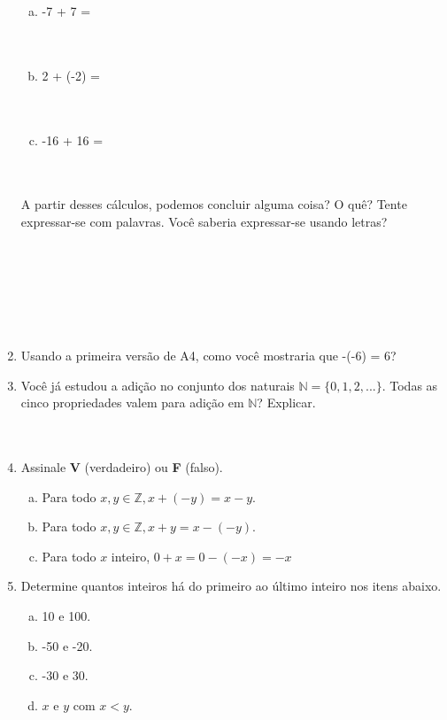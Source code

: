 \documentclass[a4paper,14pt]{article}
\begin{document}
\begin{multicols}{2}
\begin{enumerate}
\begin{enumerate}[a)]
    				\item -7 + 7 = \\\\\\
    				\item 2 + (-2) = \\\\\\
    				\item -16 + 16 = \\\\\\
    			\end{enumerate}
    			A partir desses cálculos, podemos concluir alguma coisa? O quê? Tente expressar-se com palavras. Você saberia expressar-se usando letras? \\\\\\\\\\\\\\
    			\item Usando a primeira versão de A4, como você mostraria que -(-6) = 6? \newpage
    			\item Você já estudou a adição no conjunto dos naturais $\mathbb{N} = \{0, 1, 2, ...\}$. Todas as cinco propriedades valem para adição em $\mathbb{N}$? Explicar. \\\\\\
    			\item Assinale \textbf{V} (verdadeiro) ou \textbf{F} (falso).
    			\begin{enumerate}[a)]
    				\item Para todo $x, y \in \mathbb{Z}, x + (-y) = x - y$.
    				\item Para todo $x, y \in \mathbb{Z}, x + y = x -(-y)$.
    				\item Para todo $x$ inteiro, $0 + x = 0 -(-x) = -x$
       			\end{enumerate}
       			\item Determine quantos inteiros há do primeiro ao último inteiro nos itens abaixo.
       			\begin{enumerate}[a)]
       				\item 10 e 100.
       				\item -50 e -20.
       				\item -30 e 30.
       				\item $x$ e $y$ com $x < y$.
       			\end{enumerate}

\end{enumerate}
\end{multicols}
\end{document}
